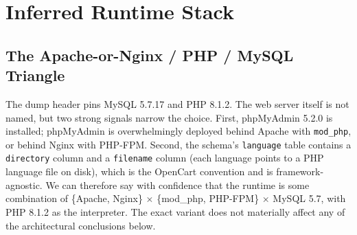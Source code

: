 \documentclass[11pt,a4paper]{article}
\begin{document}
\section{Inferred Runtime Stack}\label{sec:stack}

\subsection{The Apache-or-Nginx / PHP / MySQL Triangle}

The dump header pins MySQL 5.7.17 and PHP 8.1.2. The web server itself is
not named, but two strong signals narrow the choice. First, phpMyAdmin 5.2.0
is installed; phpMyAdmin is overwhelmingly deployed behind Apache with
\texttt{mod\_php}, or behind Nginx with PHP-FPM. Second, the schema's
\texttt{language} table contains a \texttt{directory} column and a
\texttt{filename} column (each language points to a PHP language file on
disk), which is the OpenCart convention and is framework-agnostic.
We can therefore say with confidence that the runtime is some
combination of \{Apache, Nginx\} $\times$ \{mod\_php, PHP-FPM\} $\times$
MySQL 5.7, with PHP 8.1.2 as the interpreter. The exact variant does not
materially affect any of the architectural conclusions below.
\end{document}
